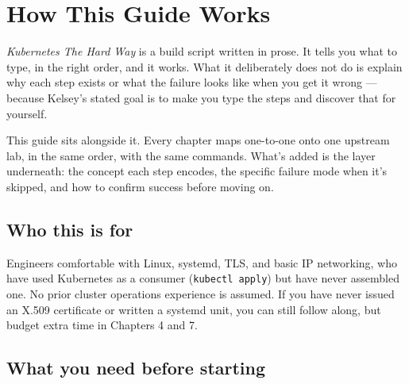\documentclass[11pt,oneside]{report}
\begin{document}
\setcounter{page}{1}
\pagestyle{fancy}

{\hypersetup{linkcolor=navy}
\renewcommand{\contentsname}{Contents}
\tableofcontents}

\cleardoublepage
{}
\setcounter{page}{1}
\setcounter{chapter}{-1}

\hypertarget{how-this-guide-works}{%
\chapter*{How This
Guide
Works}\label{how-this-guide-works}}


\emph{Kubernetes The
Hard Way} is a build
script written in
prose. It tells you
what to type, in the
right order, and it
works. What it
deliberately does
not do is explain
why each step exists
or what the failure
looks like when you
get it wrong ---
because Kelsey's
stated goal is to
make you type the
steps and discover
that for yourself.

This guide sits
alongside it. Every
chapter maps
one-to-one onto one
upstream lab, in the
same order, with the
same commands.
What's added is the
layer underneath:
the concept each
step encodes, the
specific failure
mode when it's
skipped, and how to
confirm success
before moving on.

\hypertarget{who-this-is-for}{%
\section*{Who this
is
for}\label{who-this-is-for}}

Engineers
comfortable with
Linux, systemd, TLS,
and basic IP
networking, who have
used Kubernetes as a
consumer
(\texttt{kubectl\ apply})
but have never
assembled one. No
prior cluster
operations
experience is
assumed. If you have
never issued an
X.509 certificate or
written a systemd
unit, you can still
follow along, but
budget extra time in
Chapters 4 and 7.

\hypertarget{what-you-need-before-starting}{%
\section*{What you
need before
starting}\label{what-you-need-before-starting}}
\end{document}
